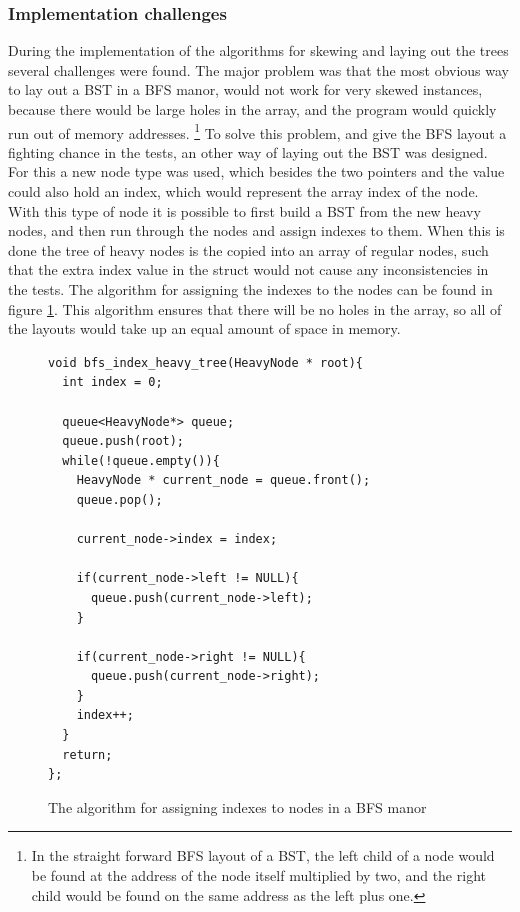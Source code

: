 \documentclass{article}
\begin{document}
\subsubsection{Implementation challenges}
During the implementation of the algorithms for skewing and laying out the trees several challenges were found. The major problem was that the most obvious way to lay out a BST in a BFS manor, would not work for very skewed instances, because there would be large holes in the array, and the program would quickly run out of memory addresses. \footnote{In the straight forward BFS layout of a BST, the left child of a node would be found at the address of the node itself multiplied by two, and the right child would be found on the same address as the left plus one.} To solve this problem, and give the BFS layout a fighting chance in the tests, an other way of laying out the BST was designed. For this a new node type was used, which besides the two pointers and the value could also hold an index, which would represent the array index of the node. With this type of node it is possible to first build a BST from the new heavy nodes, and then run through the nodes and assign indexes to them. When this is done the tree of heavy nodes is the copied into an array of regular nodes, such that the extra index value in the struct would not cause any inconsistencies in the tests. The algorithm for assigning the indexes to the nodes can be found in figure \ref{code:bfs_index}. This algorithm ensures that there will be no holes in the array, so all of the layouts would take up an equal amount of space in memory.

\begin{figure}[H]
	\centering
	\begin{lstlisting}
void bfs_index_heavy_tree(HeavyNode * root){
  int index = 0;

  queue<HeavyNode*> queue;
  queue.push(root);
  while(!queue.empty()){
    HeavyNode * current_node = queue.front();
    queue.pop();

    current_node->index = index;

    if(current_node->left != NULL){
      queue.push(current_node->left);
    }

    if(current_node->right != NULL){
      queue.push(current_node->right);
    }
    index++;
  }
  return;
};
	\end{lstlisting}	
	\caption{The algorithm for assigning indexes to nodes in a BFS manor}
	\label{code:bfs_index}
\end{figure}
\end{document}
